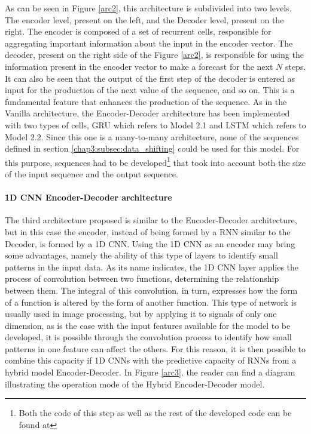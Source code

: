 As can be seen in Figure \ref{arc2}, this architecture is subdivided into two levels. The encoder level, present on the left, and the Decoder level, present on the right. The encoder is composed of a set of recurrent cells, responsible for aggregating important information about the input in the encoder vector. The decoder, present on the right side of the Figure \ref{arc2}, is responsible for using the information present in the encoder vector to make a forecast for the next $N$ steps. It can also be seen that the output of the first step of the decoder is entered as input for the production of the next value of the sequence, and so on. This is a fundamental feature that enhances the production of the sequence. As in the Vanilla architecture, the Encoder-Decoder architecture has been implemented with two types of cells, \ac{GRU} which refers to Model 2.1 and \ac{LSTM} which refers to Model 2.2. Since this one is a many-to-many architecture, none of the sequences defined in section \ref{chap3:subsec:data_shifting} could be used for this model. For this purpose, sequences had to be developed\footnote{Both the code of this step as well as the rest of the developed code can be found at} that took into account both the size of the input sequence and the output sequence.



\paragraph{1D CNN Encoder-Decoder architecture}


The third architecture proposed is similar to the Encoder-Decoder architecture, but in this case the encoder, instead of being formed by a \ac{RNN} similar to the Decoder, is formed by a \ac{1D CNN}. Using the \ac{1D CNN} as an encoder may bring some advantages, namely the ability of this type of layers to identify small patterns in the input data.  As its name indicates, the \ac{1D CNN} layer applies the process of convolution between two functions, determining the relationship between them. The integral of this convolution, in turn, expresses how the form of a function is altered by the form of another function. This type of network is usually used in image processing, but by applying it to signals of only one dimension, as is the case with the input features available for the model to be developed, it is possible through the convolution process to identify how small patterns in one feature can affect the others. For this reason, it is then possible to combine this capacity if \ac{1D CNN}s with the predictive capacity of \ac{RNN}s from a hybrid model Encoder-Decoder. In Figure \ref{arc3}, the reader can find a diagram illustrating the operation mode of the Hybrid Encoder-Decoder model.

